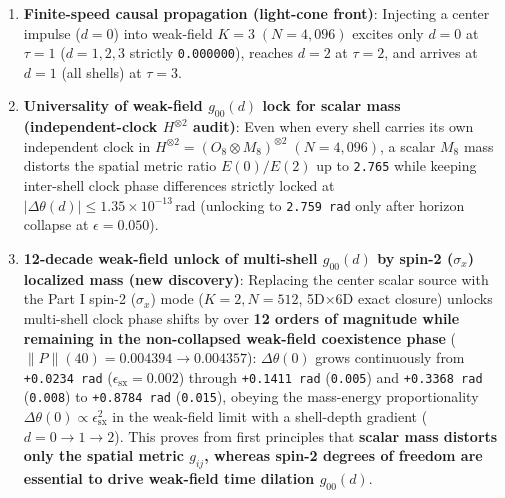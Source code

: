 \documentclass[
  a4paper,
]{article}
\providecommand{\tightlist}{%
  \setlength{\itemsep}{0pt}\setlength{\parskip}{0pt}}
\begin{document}
\begin{enumerate}
  \begin{itemize}
  \tightlist
  \item
    \textbf{Weak-field coexistence phase
    (\(\epsilon = 0.6\,\epsilon_c(K)\))}: At \(K=4\), \(\Delta\phi(d)\)
    decays by \(\approx 0.20\) (\(1/5\)) per shell across
    \(d = 0 \to 1 \to 2\), which maps to
    \textbf{\(\Delta\phi(r) \propto 1/r\)} under the Part III
    logarithmic distance map \(r = 5^d\), accompanied by a
    norm-conserving sign-flip ripple at \(d = K - 1\).
  \item
    \textbf{Strong-field horizon phase
    (\(\epsilon = 0.16 > \epsilon_c(K)\))}: Outside the singular core
    \(d = 0\) (\(\Delta\phi \approx +44 \sim +52\)), the exterior shells
    \(d = 1 \dots K\) follow a remarkably regular \textbf{uniform linear
    gradient \(\Delta\phi(d) \approx 3.8\,(K - d)\)} (\(K=2\):
    \texttt{+4.09,\ 0.00}; \(K=3\): \texttt{+7.85,\ +4.03,\ 0.00};
    \(K=4\): \texttt{+11.43,\ +7.81,\ +4.18,\ 0.00}).
  \end{itemize}
\item
  \textbf{Finite-speed causal propagation (light-cone front)}: Injecting
  a center impulse (\(d=0\)) into weak-field \(K=3\;(N=4{,}096)\)
  excites only \(d=0\) at \(\tau=1\) (\(d=1,2,3\) strictly
  \texttt{0.000000}), reaches \(d=2\) at \(\tau=2\), and arrives at
  \(d=1\) (all shells) at \(\tau=3\).
\item
  \textbf{Universality of weak-field \(g_{00}(d)\) lock for scalar mass
  (independent-clock \(H^{\otimes 2}\) audit)}: Even when every shell
  carries its own independent clock in
  \textbf{\(H^{\otimes 2} = (O_8 \otimes M_8)^{\otimes 2}\;(N=4{,}096)\)},
  a scalar \(M_8\) mass distorts the spatial metric ratio \(E(0)/E(2)\)
  up to \texttt{2.765} while keeping inter-shell clock phase differences
  strictly locked at
  \textbf{\(|\Delta\theta(d)| \le 1.35 \times 10^{-13}\,\mathrm{rad}\)}
  (unlocking to \texttt{2.759\ rad} only after horizon collapse at
  \(\epsilon = 0.050\)).
\item
  \textbf{12-decade weak-field unlock of multi-shell \(g_{00}(d)\) by
  spin-2 (\(\sigma_x\)) localized mass (new discovery)}: Replacing the
  center scalar source with the Part I spin-2 (\(\sigma_x\)) mode
  (\(K=2, N=512\), 5D×6D exact closure) unlocks multi-shell clock phase
  shifts by over \textbf{12 orders of magnitude while remaining in the
  non-collapsed weak-field coexistence phase}
  (\(\|P\|(40) = 0.004394 \to 0.004357\)): \(\Delta\theta(0)\) grows
  continuously from \texttt{+0.0234\ rad}
  (\(\epsilon_{\mathrm{sx}}=0.002\)) through \texttt{+0.1411\ rad}
  (\texttt{0.005}) and \texttt{+0.3368\ rad} (\texttt{0.008}) to
  \texttt{+0.8784\ rad} (\texttt{0.015}), obeying the mass-energy
  proportionality
  \textbf{\(\Delta\theta(0) \propto \epsilon_{\mathrm{sx}}^2\)} in the
  weak-field limit with a shell-depth gradient (\(d=0 \to 1 \to 2\)).
  This proves from first principles that \textbf{scalar mass distorts
  only the spatial metric \(g_{ij}\), whereas spin-2 degrees of freedom
  are essential to drive weak-field time dilation \(g_{00}(d)\)}.
\end{enumerate}
\end{document}
